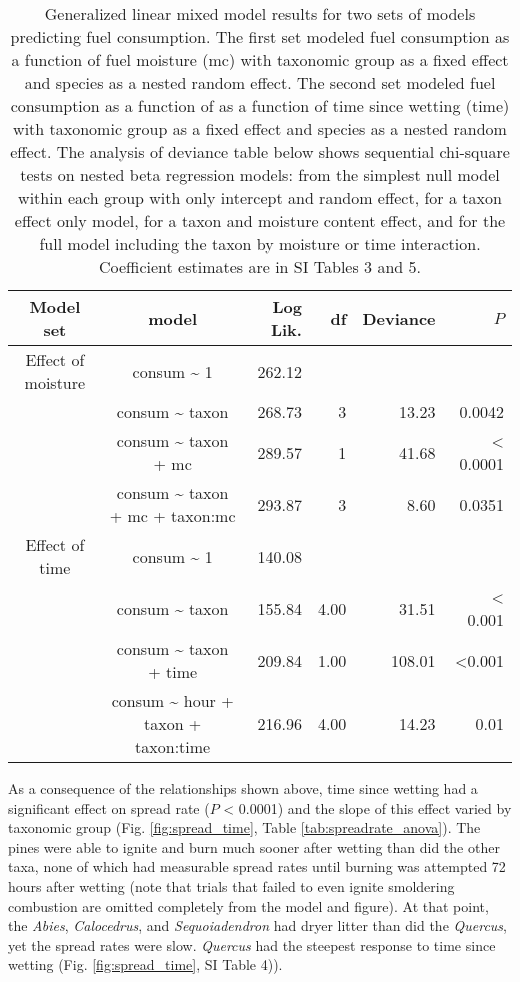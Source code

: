 \documentclass[letterpaper,12pt]{article}
\begin{document}
\begin{table}[h]
  \caption{Generalized linear mixed model results for two sets of models
    predicting fuel consumption. The first set modeled fuel consumption as a
    function of fuel moisture (mc) with taxonomic group as a fixed effect and
    species as a nested random effect. The second set modeled fuel consumption
    as a function of as a function of time since wetting (time) with taxonomic
    group as a fixed effect and species as a nested random effect. The analysis
    of deviance table below shows sequential chi-square tests on nested beta
    regression models: from the simplest null model within each group with only
    intercept and random effect, for a taxon effect only model, for a taxon and
    moisture content effect, and for the full model including the taxon by
    moisture or time interaction. Coefficient estimates are in SI Tables 3 and
    5.}
  \label{tab:consume_anova}
  \centering

  \begin{tabular}{ccrrrr}
\toprule
Model set & model & Log Lik. & df & Deviance & $P$ \\ 
\midrule
  Effect of moisture &  consum \~{} 1 & 262.12 &  &  &  \\ 
   & consum \~{} taxon & 268.73 & 3 & 13.23 & 0.0042 \\ 
   & consum \~{} taxon + mc & 289.57 & 1 & 41.68 & < 0.0001 \\ 
   & consum \~{} taxon + mc + taxon:mc & 293.87 & 3 & 8.60 & 0.0351 \\ 
\midrule
Effect of time &  consum \~{} 1 & 140.08 &  &  &  \\ 
 &  consum \~{} taxon & 155.84 & 4.00 & 31.51 & < 0.001 \\ 
 & consum \~{} taxon + time & 209.84 & 1.00 & 108.01 & <0.001 \\ 
 & consum \~{} hour + taxon + taxon:time & 216.96 & 4.00 & 14.23 & 0.01 \\ 
    \bottomrule
    \end{tabular}
\end{table}


As a consequence of the relationships shown above, time since wetting had a
significant effect on spread rate ($P$ < 0.0001) and the slope of this effect
varied by taxonomic group (Fig. \ref{fig:spread_time}, Table
\ref{tab:spreadrate_anova}). The pines were able to ignite and burn much sooner
after wetting than did the other taxa, none of which had measurable spread
rates until burning was attempted 72 hours after wetting (note that trials that
failed to even ignite smoldering combustion are omitted completely from the
model and figure). At that point, the \emph{Abies}, \emph{Calocedrus}, and
\emph{Sequoiadendron} had dryer litter than did the \emph{Quercus}, yet the
spread rates were slow. \emph{Quercus} had the steepest response to time since
wetting (Fig. \ref{fig:spread_time}, SI Table 4)).
\end{document}
